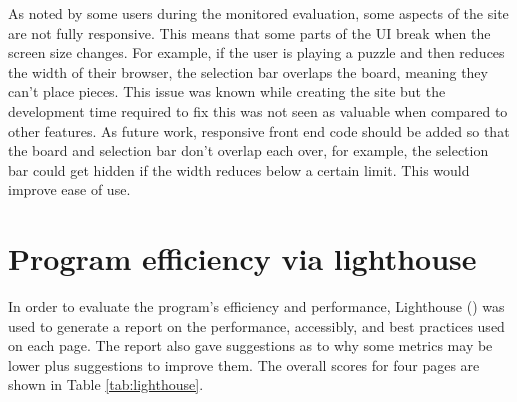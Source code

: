 \documentclass{l4proj}
\begin{document}
As noted by some users during the monitored evaluation, some aspects of the site are not fully responsive. This means that some parts of the UI break when the screen size changes. For example, if the user is playing a puzzle and then reduces the width of their browser, the selection bar overlaps the board, meaning they can't place pieces. This issue was known while creating the site but the development time required to fix this was not seen as valuable when compared to other features. As future work, responsive front end code should be added so that the board and selection bar don't overlap each over, for example, the selection bar could get hidden if the width reduces below a certain limit. This would improve ease of use.


\section{Program efficiency via lighthouse}
\label{section:efficiency}
In order to evaluate the program's efficiency and performance, Lighthouse (\cite{noauthor_lighthouse_nodate}) was used to generate a report on the performance, accessibly, and best practices used on each page. The report also gave suggestions as to why some metrics may be lower plus suggestions to improve them. The overall scores for four pages are shown in Table \ref{tab:lighthouse}.  
\end{document}
